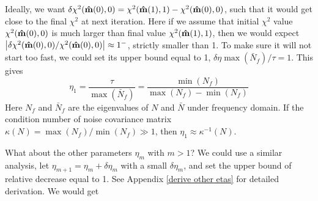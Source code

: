 \documentclass[twocolumn,linenumbers]{aastex631}
\newcommand{\vbd}{\vb{d}}
\newcommand{\inv}[1]{#1^{-1}}
\newcommand{\hatm}{\vb{\hat{m}}}
\newcommand{\Nbar}{\bar{N}}
\begin{document}
Ideally, we want
$\delta \chi^2(\hatm(0),0) = \chi^2(\hatm(1), 1) - \chi^2(\hatm(0),0)$,
such that it would get close to the final $\chi^2$ at next iteration.
Here if we assume that initial $\chi^2$ value $\chi^2(\hatm(0),0)$ is much
larger than final value $\chi^2(\hatm(1),1)$,
then we would expect
$\qty|\delta\chi^2(\hatm(0),0)/\chi^2(\hatm(0),0)| \approx 1^-$,
strictly smaller than 1.
To make sure it will not start too fast, 
we could set its upper bound equal to 1, $\delta \eta \max(\Nbar_f) / \tau = 1$.
This gives
\begin{equation}
\eta_1 = \frac{\tau}{\max(\Nbar_f)} = \frac{\min(N_f)}{\max(N_f) - \min(N_f)}
\end{equation}
Here $N_f$ and $\Nbar_f$ are the eigenvalues of $N$ and $\Nbar$ under frequency
domain.
If the condition number of noise covariance matrix
$\kappa(N) = \max(N_f)/\min(N_f) \gg 1$,
then $\eta_1 \approx \inv{\kappa} (N)$.

What about the other parameters $\eta_m$ with $m > 1$?
We could use a similar analysis,
let $\eta_{m+1} = \eta_m + \delta \eta_m$ with a small $\delta\eta_m$,
and set the upper bound of relative decrease equal to 1.
See Appendix \ref{derive other etas} for detailed derivation.
We would get
\end{document}
